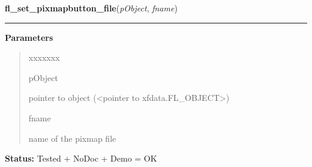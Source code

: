 \hspace{.8\funcindent}\begin{boxedminipage}{\funcwidth}

    \raggedright \textbf{fl\_set\_pixmapbutton\_file}(\textit{pObject}, \textit{fname})

    \vspace{-1.5ex}

    \rule{\textwidth}{0.5\fboxrule}
\setlength{\parskip}{2ex}
\setlength{\parskip}{1ex}
      \textbf{Parameters}
      \vspace{-1ex}

      \begin{quote}
        \begin{Ventry}{xxxxxxx}

          \item[pObject]

          pointer to object ({\textless}pointer to 
          xfdata.FL\_OBJECT{\textgreater})

          \item[fname]

          name of the pixmap file

        \end{Ventry}

      \end{quote}

\textbf{Status:} Tested + NoDoc + Demo = OK



    \end{boxedminipage}

    \label{xformslib:library:fl_set_pixmap_file}

    \vspace{0.5ex}

